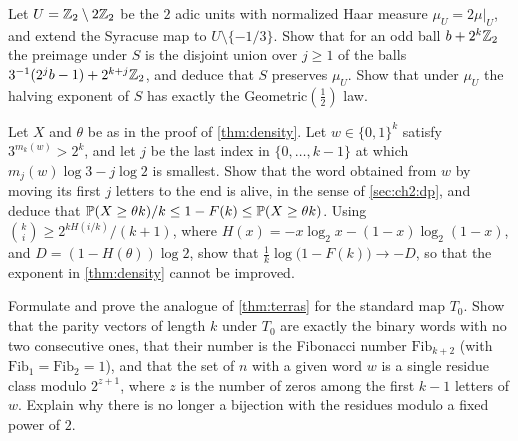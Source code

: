 \begin{exercise}\label{ex:ch2:syrhaar}
Let $U=\mathbb{Z}_2\setminus2\mathbb{Z}_2$ be the $2$ adic units with normalized Haar measure
$\mu_U=2\mu|_U$, and extend the Syracuse map to $U\setminus\{-1/3\}$. Show
that for an odd ball $b+2^k\mathbb{Z}_2$ the preimage under $S$ is the disjoint union
over $j\geq1$ of the balls $3^{-1}(2^jb-1)+2^{k+j}\mathbb{Z}_2$, and deduce that $S$
preserves $\mu_U$. Show that under $\mu_U$ the halving exponent of $S$ has
exactly the Geometric$(\tfrac12)$ law.
\end{exercise}

\begin{exercise}\label{ex:ch2:sharp}
Let $X$ and $\theta$ be as in the proof of \cref{thm:density}. Let $w\in\{0,1\}^k$ satisfy $3^{m_k(w)}>2^k$, and let $j$ be the last index in $\{0,\ldots,k-1\}$ at which $m_j(w)\log3-j\log2$ is smallest. Show that the word obtained from $w$ by moving its first $j$ letters to the end is alive, in the sense of \cref{sec:ch2:dp}, and deduce that $\mathbb{P}(X\geq\theta k)/k\leq1-F(k)\leq\mathbb{P}(X\geq\theta k)$. Using $\binom ki\geq2^{kH(i/k)}/(k+1)$, where $H(x)=-x\log_2x-(1-x)\log_2(1-x)$, and $D=(1-H(\theta))\log2$, show that $\frac1k\log\bigl(1-F(k)\bigr)\to-D$, so that the exponent in \cref{thm:density} cannot be improved.
\end{exercise}

\begin{exercise}\label{ex:ch2:standard}
Formulate and prove the analogue of \cref{thm:terras} for the standard map
$T_0$. Show that the parity vectors of length $k$ under $T_0$ are exactly the
binary words with no two consecutive ones, that their number is the
Fibonacci number $\mathrm{Fib}_{k+2}$ (with $\mathrm{Fib}_1=\mathrm{Fib}_2=1$), and that the set of $n$ with a given word $w$ is a
single residue class modulo $2^{z+1}$, where $z$ is the number of zeros among
the first $k-1$ letters of $w$. Explain why there is no longer a bijection
with the residues modulo a fixed power of $2$.
\end{exercise}
